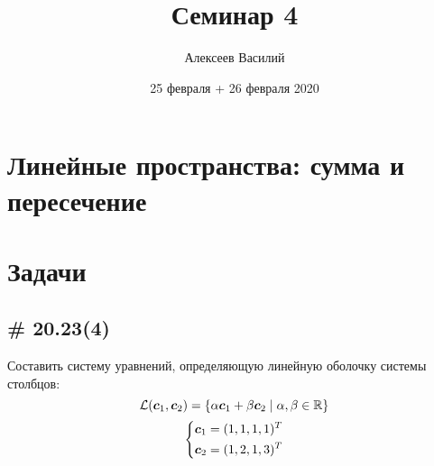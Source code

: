 \documentclass[a4paper,12pt]{article}
\author{Алексеев Василий}
\title{Семинар 4}
\date{25 февраля + 26 февраля 2020}
\begin{document}
  \maketitle
  
  \tableofcontents

  \thispagestyle{empty}
  
  \newpage
  


  \section{Линейные пространства: сумма и пересечение}
  
  \section{Задачи}
  
  
  \subsection{\# 20.23(4)}
  
  Составить систему уравнений, определяющую линейную оболочку системы столбцов:
  \[
    \mathcal L(\boldsymbol c_1, \boldsymbol c_2) = \{\alpha \boldsymbol c_1 + \beta \boldsymbol c_2 \mid \alpha, \beta \in \operatorname{\mathbb R}\}
  \]
  \[
    \left\{
      \begin{aligned}
        &\boldsymbol c_1 = (1, 1, 1, 1)^T\\
        &\boldsymbol c_2 = (1, 2, 1, 3)^T
      \end{aligned}
    \right.
  \]
  
\end{document}
